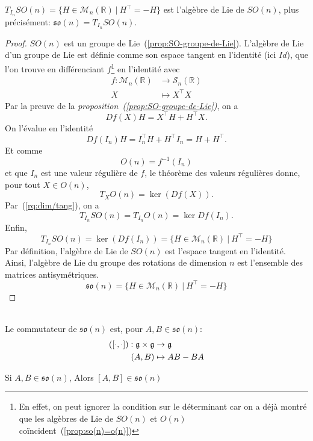 \documentclass[12pt]{report}
\begin{document}
\begin{proposition}
$T_{I_n}SO(n)=\{H\in \mathcal{M}_n(\mathbb{R})~|~H^{\top}=-H\}$ est l'algèbre de Lie de $SO(n)$, plus précisément: $\mathfrak{so}(n)=T_{I_n}SO(n)$.
\end{proposition}

\begin{proof}
$SO(n)$ est un groupe de Lie~(\ref{prop:SO-groupe-de-Lie}). L'algèbre de Lie d'un groupe de Lie est définie comme son espace tangent en l'identité (ici $Id$), que l'on trouve en différenciant $f$\footnote{En effet, on peut ignorer la condition sur le déterminant car on a déjà montré que les algèbres de Lie de $SO(n)$ et $O(n)$ coïncident~(\ref{prop:so(n)=o(n)})} en l'identité avec
\[
\begin{aligned}
f \colon \mathcal{M}_n(\mathbb{R}) &\longrightarrow \mathcal{S}_n(\mathbb{R})\\
X &\longmapsto X^{\top}X
\end{aligned}
\]
Par la preuve de la \textit{proposition~(\ref{prop:SO-groupe-de-Lie})}, on a
\[
Df(X)H=X^{\top}H+H^{\top}X.
\]
On l'évalue en l'identité
\[
Df(I_n)H=I_n^{\top}H+H^{\top}I_n=H+H^{\top}.
\]
Et comme
\[
O(n)=f^{-1}(I_n)
\]
et que $I_n$ est une valeur régulière de $f$, le théorème des valeurs régulières donne, pour tout $X\in O(n)$,
\[
T_{X}O(n)=\ker(Df(X)).
\]
Par~(\ref{rq:dim/tang}), on a
\[
T_{I_n}SO(n)=T_{I_n}O(n)=\ker Df(I_n).
\]
Enfin,
\[
T_{I_n}SO(n)=\ker(Df(I_n))=\{H\in\mathcal{M}_n(\mathbb{R})~|~H^{\top}=-H\}
\]
Par définition, l'algèbre de Lie de $SO(n)$ est l'espace tangent en l'identité.\\
Ainsi, l'algèbre de Lie du groupe des rotations de dimension $n$ est l'ensemble des matrices antisymétriques.
\[
\mathfrak{so}(n)=\{H\in\mathcal{M}_n(\mathbb{R})~|~H^{\top}=-H\}
\]
\end{proof}

\begin{definition} \leavevmode\\
Le commutateur de $\mathfrak{so}(n)$ est, pour $A,B\in\mathfrak{so}(n)$:
\[
\begin{aligned}
(\relax[\cdot,\cdot]) : \mathfrak{g} \times \mathfrak{g} &\to \mathfrak{g}\\
(A,B) &\mapsto  AB-BA
\end{aligned}
\]
\end{definition}

\begin{proposition}
Si $A,B\in \mathfrak{so}(n)$, Alors $[A,B]\in\mathfrak{so}(n)$
\end{proposition}
\end{document}

